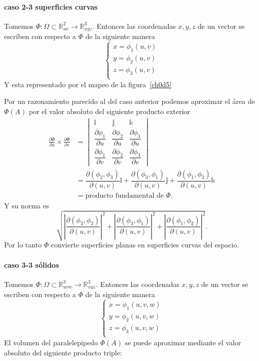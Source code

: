 \documentclass[mid,fleqn,draft,twoside]{notasdeclase}
\renewcommand{\t}{\times}
\newcommand{\pdd}[2]{\dfrac{\partial #1}{\partial #2}}
\newcommand{\R}{\mathbb{R}}
\newcommand{\ihat}{\mathbb i}
\newcommand{\jhat}{\mathbb j}
\newcommand{\khat}{\mathbb k}
\begin{document}
 
\paragraph{caso 2-3 superficies curvas} Tomemos $\Phi\colon\Omega\subset\R^2_{uv}\to\R^3_{xyz}$. Entonces las coordenadas $x,y,z$ de un vector se escriben con respecto a $\Phi$ de la siguiente manera
\[ 
 \begin{cases}
x = \phi_1(u,v) \\
y = \phi_2(u,v) \\
z = \phi_3(u,v) \\
\end{cases}
 \]
 Y esta representado por el mapeo de la figura~\ref{ch0d5}
% 
 
 Por un razonamiento parecido al del caso anterior podemos aproximar el área de $\Phi(A)$ por el valor absoluto del siguiente producto exterior
 \begin{align*}
 	\frac{\partial\Phi}{\partial u}\t\frac{\partial\Phi}{\partial v} &= \begin{vmatrix}
 										\ihat& \jhat& \khat \\[.3em]
 										\pdd{\phi_1}{u}& \pdd{\phi_2}{u}& \pdd{\phi_3}{u} \\[.8em]
 										\pdd{\phi_1}{v}& \pdd{\phi_2}{v}& \pdd{\phi_3}{v}
 										\end{vmatrix} \\
 																	 &=\pdd{(\phi_2,\phi_3)}{(u,v)}\ihat + \pdd{(\phi_3,\phi_1)}{(u,v)} \jhat + \pdd{(\phi_1,\phi_2)}{(u,v)} \khat \\
 																	 &=\text{producto fundamental de $\Phi$.}
 \end{align*}
 Y su norma es
 \[ \sqrt{\left\lvert \pdd{(\phi_2,\phi_3)}{(u,v)} \right\rvert^2 + \left\lvert\pdd{(\phi_3,\phi_1)}{(u,v)}\right\rvert^2  + \left\lvert\pdd{(\phi_1,\phi_2)}{(u,v)}\right\rvert^2 }. \]
 Por lo tanto $\Phi$ convierte superficies planas en superficies curvas del espacio.
 

\paragraph{caso 3-3 sólidos} Tomemos $\Phi\colon\Omega\subset\R^3_{uvw}\to\R^3_{xyz}$. Entonces las coordenadas $x,y,z$ de un vector se escriben con respecto a $\Phi$ de la siguiente manera
 \[ 
 \begin{cases}
 x = \phi_1(u,v,w) \\
 y = \phi_2(u,v,w) \\
 z = \phi_3(u,v,w) \\
 \end{cases}
 \]
 El volumen del paralelepipedo $\Phi(A)$ se puede aproximar mediante el valor absoluto del siguiente producto triple:
\end{document}
